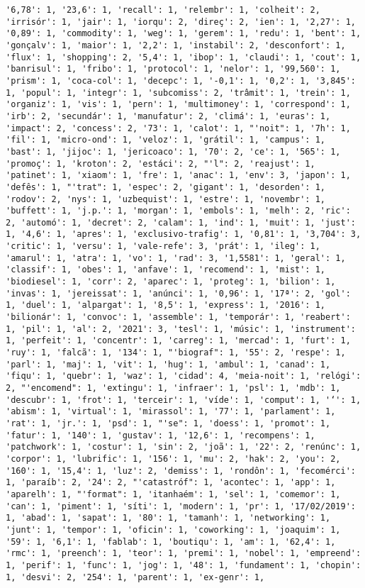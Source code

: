 \documentclass[11pt]{article}
\begin{document}
\begin{Verbatim}[commandchars=\\\{\}]
'6,78': 1, '23,6': 1, 'recall': 1, 'relembr': 1, 'colheit': 2, 'irrisór': 1, 'jair': 1, 'iorqu': 2, 'direç': 2, 'ien': 1, '2,27': 1, '0,89': 1, 'commodity': 1, 'weg': 1, 'gerem': 1, 'redu': 1, 'bent': 1, 'gonçalv': 1, 'maior': 1, '2,2': 1, 'instabil': 2, 'desconfort': 1, 'flux': 1, 'shopping': 2, '5,4': 1, 'ibop': 1, 'claudi': 1, 'cout': 1, 'banrisul': 1, 'fribo': 1, 'protocol': 1, 'nelor': 1, '99,560': 1, 'prism': 1, 'coca-col': 1, 'decepc': 1, '-0,1': 1, '0,2': 1, '3,845': 1, 'popul': 1, 'integr': 1, 'subcomiss': 2, 'trâmit': 1, 'trein': 1, 'organiz': 1, 'vis': 1, 'pern': 1, 'multimoney': 1, 'correspond': 1, 'irb': 2, 'secundár': 1, 'manufatur': 2, 'climá': 1, 'euras': 1, 'impact': 2, 'concess': 2, '73': 1, 'calot': 1, "'noit": 1, '7h': 1, 'fil': 1, 'micro-ond': 1, 'veloz': 1, 'grátil': 1, 'campus': 1, 'bast': 1, 'jijoc': 1, 'jericoaco': 1, '70': 2, 'ce': 1, '565': 1, 'promoç': 1, 'kroton': 2, 'estáci': 2, "'l": 2, 'reajust': 1, 'patinet': 1, 'xiaom': 1, 'fre': 1, 'anac': 1, 'env': 3, 'japon': 1, 'defês': 1, "'trat": 1, 'espec': 2, 'gigant': 1, 'desorden': 1, 'rodov': 2, 'nys': 1, 'uzbequist': 1, 'estre': 1, 'novembr': 1, 'buffett': 1, 'j.p.': 1, 'morgan': 1, 'embols': 1, 'melh': 2, 'ric': 2, 'automó': 1, 'decret': 2, 'calam': 1, 'ind': 1, 'muit': 1, 'just': 1, '4,6': 1, 'apres': 1, 'exclusivo-trafig': 1, '0,81': 1, '3,704': 3, 'critic': 1, 'versu': 1, 'vale-refe': 3, 'prát': 1, 'ileg': 1, 'amarul': 1, 'atra': 1, 'vo': 1, 'rad': 3, '1,5581': 1, 'geral': 1, 'classif': 1, 'obes': 1, 'anfave': 1, 'recomend': 1, 'mist': 1, 'biodiesel': 1, 'corr': 2, 'aparec': 1, 'proteg': 1, 'bilion': 1, 'invas': 1, 'jereissat': 1, 'anúnci': 1, '0,96': 1, '17ª': 2, 'gol': 1, 'duel': 1, 'alpargat': 1, '8,5': 1, 'express': 1, '2016': 1, 'bilionár': 1, 'convoc': 1, 'assemble': 1, 'temporár': 1, 'reabert': 1, 'pil': 1, 'al': 2, '2021': 3, 'tesl': 1, 'músic': 1, 'instrument': 1, 'perfeit': 1, 'concentr': 1, 'carreg': 1, 'mercad': 1, 'furt': 1, 'ruy': 1, 'falcã': 1, '134': 1, "'biograf": 1, '55': 2, 'respe': 1, 'parl': 1, 'maj': 1, 'vit': 1, 'hug': 1, 'ambul': 1, 'canad': 1, 'fiqu': 1, 'quebr': 1, 'waz': 1, 'cidad': 4, 'meia-noit': 1, 'relógi': 2, "'encomend": 1, 'extingu': 1, 'infraer': 1, 'psl': 1, 'mdb': 1, 'descubr': 1, 'frot': 1, 'terceir': 1, 'víde': 1, 'comput': 1, '‘': 1, 'abism': 1, 'virtual': 1, 'mirassol': 1, '77': 1, 'parlament': 1, 'rat': 1, 'jr.': 1, 'psd': 1, "'se": 1, 'doess': 1, 'promot': 1, 'fatur': 1, '140': 1, 'gustav': 1, '12,6': 1, 'recompens': 1, 'patchwork': 1, 'costur': 1, 'sin': 2, 'joã': 1, '22': 2, 'renúnc': 1, 'corpor': 1, 'lubrific': 1, '156': 1, 'mu': 2, 'hak': 2, 'you': 2, '160': 1, '15,4': 1, 'luz': 2, 'demiss': 1, 'rondôn': 1, 'fecomérci': 1, 'paraíb': 2, '24': 2, "'catastróf": 1, 'acontec': 1, 'app': 1, 'aparelh': 1, "'format": 1, 'itanhaém': 1, 'sel': 1, 'comemor': 1, 'can': 1, 'piment': 1, 'síti': 1, 'modern': 1, 'pr': 1, '17/02/2019': 1, 'abad': 1, 'sapat': 1, '80': 1, 'tamanh': 1, 'networking': 1, 'junt': 1, 'tempor': 1, 'oficin': 1, 'coworking': 1, 'joaquim': 1, '59': 1, '6,1': 1, 'fablab': 1, 'boutiqu': 1, 'am': 1, '62,4': 1, 'rmc': 1, 'preench': 1, 'teor': 1, 'premi': 1, 'nobel': 1, 'empreend': 1, 'perif': 1, 'func': 1, 'jog': 1, '48': 1, 'fundament': 1, 'chopin': 1, 'desvi': 2, '254': 1, 'parent': 1, 'ex-genr': 1, 
\end{Verbatim}
\end{document}
